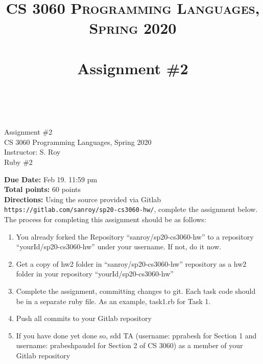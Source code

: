 \documentclass[paper=letter, fontsize=11pt]{scrartcl} %
\title{ 
    \normalfont \normalsize 
    \textsc{CS 3060 Programming Languages, Spring 2020} \\ [25pt] %
    \horrule{0.5pt} \\[0.4cm] %
    \huge Assignment \#2  \\ %
    \horrule{2pt} \\[0.5cm] %
}
\begin{document}
    \begin{center}
         Assignment \#2\\
        \small CS 3060 Programming Languages, Spring 2020 \\
        \small Instructor: S. Roy \\
        \huge Ruby \#2
    \end{center}
    
    \textbf{Due Date:}  Feb 19. 11:59 pm\\

    \textbf{Total points:} 60 points \\

    \textbf{Directions:} Using the source provided via Gitlab \@ \texttt{https://gitlab.com/sanroy/sp20-cs3060-hw/}, 
complete the assignment below. The process for completing this assignment should be as follows:

    \begin{enumerate}[noitemsep]
        \item You already forked the Repository ``sanroy/sp20-cs3060-hw'' to a repository ``yourId/sp20-cs3060-hw'' under your username. If not, do it now.
        \item Get a copy of hw2 folder in ``sanroy/sp20-cs3060-hw'' repository as a hw2 folder in your repository ``yourId/sp20-cs3060-hw'' 
        \item Complete the assignment, committing changes to git. Each task code should be in a separate ruby file. As an example, task1.rb for Task 1. 
        \item Push all commits to your Gitlab repository
        \item If you have done yet done so, sdd TA (username: pprabesh for Section 1 and username: prabeshpaudel for Section 2 of CS 3060) as a member of your Gitlab repository
    \end{enumerate}
\end{document}
